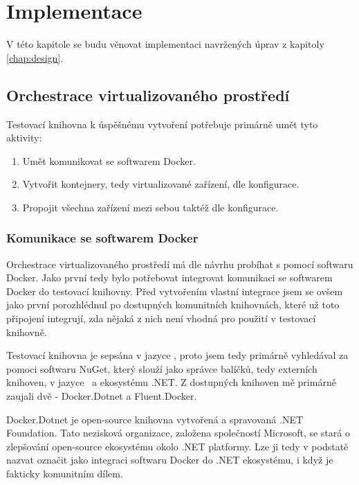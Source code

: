 \chapter{Implementace}\label{chap:implementation}

V této kapitole se budu věnovat implementaci navržených úprav z kapitoly \ref{chap:design}.


\section{Orchestrace virtualizovaného prostředí}
Testovací knihovna k úspěšnému vytvoření potřebuje primárně umět tyto aktivity:

\begin{enumerate}
    \item Umět komunikovat se softwarem Docker.
    \item Vytvořit kontejnery, tedy virtualizované zařízení, dle konfigurace.
    \item Propojit všechna zařízení mezi sebou taktéž dle konfigurace.
\end{enumerate}

\subsection{Komunikace se softwarem Docker}
Orchestrace virtualizovaného prostředí má dle návrhu probíhat s pomocí softwaru Docker. 
Jako první tedy bylo potřebovat integrovat komunikaci se softwarem Docker do testovací knihovny. Před vytvořením vlastní integrace jsem se ovšem jako první porozhlédnul po dostupných komunitních knihovnách, které už toto připojení integrují, zda nějaká z nich není vhodná pro použití v testovací knihovně. 

Testovací knihovna je sepsána v jazyce \csharp, proto jsem tedy primárně vyhledával za pomoci softwaru NuGet\cite{nuget}, který slouží jako správce balíčků, tedy externích knihoven, v jazyce \csharp\, a ekosystému .NET. Z dostupných knihoven mě primárně zaujali dvě - Docker.Dotnet\cite{dockerdotnet} a Fluent.Docker\cite{fluentdocker}. 

Docker.Dotnet je open-source knihovna vytvořená a spravovaná .NET Foundation. Tato nezisková organizace, založena společností Microsoft, se stará o zlepšování open-source ekosystému okolo .NET platformy\cite{dotnetfoundation}. Lze ji tedy v podstatě nazvat označit jako  integraci softwaru Docker do .NET ekosystému, i když je fakticky komunitním dílem. 


